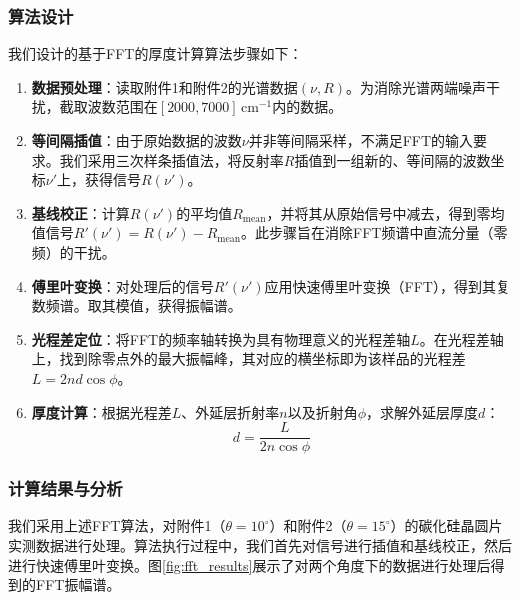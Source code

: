 \documentclass[withoutpreface,bwprint]{cumcmthesis} %
\begin{document}
\subsubsection{算法设计}
我们设计的基于FFT的厚度计算算法步骤如下：
\begin{enumerate}
    \item \textbf{数据预处理}：读取附件1和附件2的光谱数据$(\nu, R)$。为消除光谱两端噪声干扰，截取波数范围在$[2000, 7000]\, \text{cm}^{-1}$内的数据。
    \item \textbf{等间隔插值}：由于原始数据的波数$\nu$并非等间隔采样，不满足FFT的输入要求。我们采用三次样条插值法，将反射率$R$插值到一组新的、等间隔的波数坐标$\nu'$上，获得信号$R(\nu')$。
    \item \textbf{基线校正}：计算$R(\nu')$的平均值$R_{\text{mean}}$，并将其从原始信号中减去，得到零均值信号$R'(\nu') = R(\nu') - R_{\text{mean}}$。此步骤旨在消除FFT频谱中直流分量（零频）的干扰。
    \item \textbf{傅里叶变换}：对处理后的信号$R'(\nu')$应用快速傅里叶变换（FFT），得到其复数频谱。取其模值，获得振幅谱。
    \item \textbf{光程差定位}：将FFT的频率轴转换为具有物理意义的光程差轴$L$。在光程差轴上，找到除零点外的最大振幅峰，其对应的横坐标即为该样品的光程差$L = 2nd\cos\phi$。
    \item \textbf{厚度计算}：根据光程差$L$、外延层折射率$n$以及折射角$\phi$，求解外延层厚度$d$：
          $$ d = \frac{L}{2n\cos\phi} $$
\end{enumerate}

\subsubsection{计算结果与分析}

我们采用上述FFT算法，对附件1（$\theta=10^\circ$）和附件2（$\theta=15^\circ$）的碳化硅晶圆片实测数据进行处理。算法执行过程中，我们首先对信号进行插值和基线校正，然后进行快速傅里叶变换。图\ref{fig:fft_results}展示了对两个角度下的数据进行处理后得到的FFT振幅谱。
\end{document}

